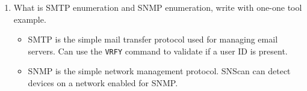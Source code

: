 \begin{enumerate}
\begin{itemize}
    \end{itemize}
    \item What is SMTP enumeration and SNMP enumeration, write with one-one tool example.
    \begin{itemize}
        \item SMTP is the simple mail transfer protocol used for managing email servers. Can use the \verb|VRFY| command to validate if a user ID is present.
        \item SNMP is the simple network management protocol. SNScan can detect devices on a network enabled for SNMP.
    \end{itemize}
\end{enumerate}